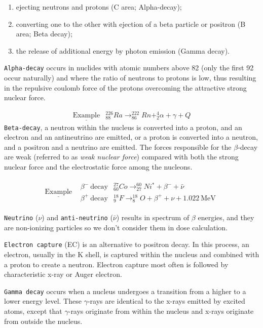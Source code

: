 \documentclass[]{book}
\providecommand{\tightlist}{%
  \setlength{\itemsep}{0pt}\setlength{\parskip}{0pt}}
\theoremstyle{definition}
\theoremstyle{definition}
\theoremstyle{definition}
\theoremstyle{remark}
\begin{document}
\begin{enumerate}
\def\labelenumi{\arabic{enumi}.}
\tightlist
\item
  ejecting neutrons and protons (C area; Alpha-decay);
\item
  converting one to the other with ejection of a beta particle or
  positron (B area; Beta decay);
\item
  the release of additional energy by photon emission (Gamma decay).
\end{enumerate}

\texttt{Alpha-decay} occurs in nuclides with atomic numbers above 82
(only the first 92 occur naturally) and where the ratio of neutrons to
protons is low, thus resulting in the repulsive coulomb force of the
protons overcoming the attractive strong nuclear force.

\[
\begin{matrix}
\underline{\text{Example}} & _{88}^{226}Ra\rightarrow _{86}^{222}Rn +_2^4\alpha +\gamma +Q
\end{matrix}
\] \texttt{Beta-decay}, a neutron within the nucleus is converted into a
proton, and an electron and an antineutrino are emitted, or a proton is
converted into a neutron, and a positron and a neutrino are emitted. The
forces responsible for the \(\beta\)-decay are weak (referred to as
\emph{weak nuclear force}) compared with both the strong nuclear force
and the electrostatic force among the nucleons.

\[
\begin{matrix}
\underline{\text{Example}} & \begin{matrix}
    \beta^-\  \text{decay}& _{60}^{27}Co\rightarrow _{27}^{60}Ni^{*} +\beta^- + \bar\nu \\ 
    \beta^+\  \text{decay} & _{9}^{18}F\rightarrow _{8}^{18}O +\beta^+ +\nu + 1.022\ \text{MeV}
  \end{matrix}
\end{matrix}
\]

\texttt{Neutrino} (\(\nu\)) and \texttt{anti-neutrino} (\(\bar \nu\))
results in spectrum of \(\beta\) energies, and they are non-ionizing
particles so we don't consider them in dose calculation.

\texttt{Electron\ capture} (EC) is an alternative to positron decay. In
this process, an electron, usually in the K shell, is captured within
the nucleus and combined with a proton to create a neutron. Electron
capture most often is followed by characteristic x-ray or Auger
electron.

\texttt{Gamma\ decay} occurs when a nucleus undergoes a transition from
a higher to a lower energy level. These \(\gamma\)-rays are identical to
the x-rays emitted by excited atoms, except that \(\gamma\)-rays
originate from within the nucleus and x-rays originate from outside the
nucleus.
\end{document}
